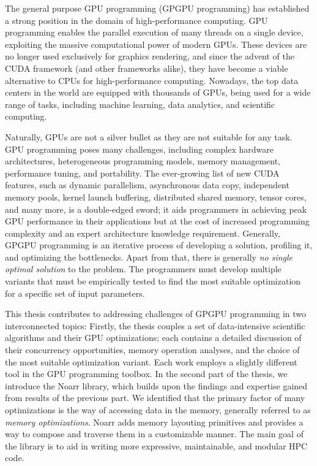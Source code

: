 
The general purpose GPU programming (GPGPU programming) has established a strong position in the domain of high-performance computing. 
GPU programming enables the parallel execution of many threads on a single device, exploiting the massive computational power of modern GPUs. 
These devices are no longer used exclusively for graphics rendering, and since the advent of the CUDA framework (and other frameworks alike), they have become a viable alternative to CPUs for high-performance computing.
Nowadays, the top data centers in the world are equipped with thousands of GPUs, being used for a wide range of tasks, including machine learning, data analytics, and scientific computing.

Naturally, GPUs are not a silver bullet as they are not suitable for any task. 
GPU programming poses many challenges, including complex hardware architectures, heterogeneous programming models, memory management, performance tuning, and portability.
The ever-growing list of new CUDA features, such as dynamic parallelism, asynchronous data copy, independent memory pools, kernel launch buffering, distributed shared memory, tensor cores, and many more, is a double-edged sword; 
it aids programmers in achieving peak GPU performance in their applications but at the cost of increased programming complexity and an expert architecture knowledge requirement.
Generally, GPGPU programming is an iterative process of developing a solution, profiling it, and optimizing the bottlenecks.
Apart from that, there is generally \emph{no single optimal solution} to the problem. The programmers must develop multiple variants that must be empirically tested to find the most suitable optimization for a specific set of input parameters.

This thesis contributes to addressing challenges of GPGPU programming in two interconnected topics: 
Firstly, the thesis couples a set of data-intensive scientific algorithms and their GPU optimizations; each contains a detailed discussion of their concurrency opportunities, memory operation analyses, and the choice of the most suitable optimization variant. Each work employs a slightly different tool in the GPU programming toolbox. 
In the second part of the thesis, we introduce the Noarr library, which builds upon the findings and expertise gained from results of the previous part. We identified that the primary factor of many optimizations is the way of accessing data in the memory, generally referred to as \emph{memory optimizations}. 
Noarr adds memory layouting primitives and provides a way to compose and traverse them in a customizable manner. The main goal of the library is to aid in writing more expressive, maintainable, and modular HPC code.

